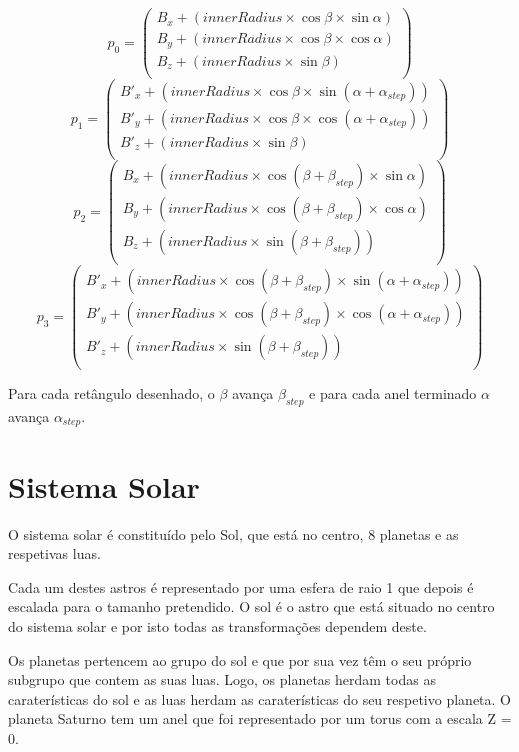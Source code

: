 \documentclass[a4paper]{article}
\newcommand{\x}{\times}
\begin{document}
\[p_0 =
\begin{pmatrix}
    B_x + (innerRadius \x \cos \beta \x \sin \alpha)\\
    B_y + (innerRadius \x \cos \beta \x \cos \alpha)\\
    B_z + (innerRadius \x \sin \beta)\\
\end{pmatrix}
\]
\[p_1 =
\begin{pmatrix}
    B'_x + (innerRadius \x \cos \beta \x \sin(\alpha + \alpha_{step}))\\
    B'_y + (innerRadius \x \cos \beta \x \cos(\alpha + \alpha_{step}))\\
    B'_z + (innerRadius \x \sin \beta)\\
\end{pmatrix}
\]
\[p_2 =
\begin{pmatrix}
    B_x + (innerRadius \x \cos(\beta + \beta_{step}) \x \sin \alpha)\\
    B_y + (innerRadius \x \cos(\beta + \beta_{step}) \x \cos \alpha)\\
    B_z + (innerRadius \x \sin(\beta + \beta_{step})) \\
\end{pmatrix}
\]
\[p_3 =
\begin{pmatrix}
    B'_x + (innerRadius \x \cos(\beta + \beta_{step}) \x \sin(\alpha + \alpha_{step}))\\
    B'_y + (innerRadius \x \cos(\beta + \beta_{step}) \x \cos(\alpha + \alpha_{step}))\\
    B'_z + (innerRadius \x \sin(\beta + \beta_{step}))\\
\end{pmatrix}
\]

Para cada retângulo desenhado, o $\beta$ avança $\beta_{step}$ e para cada anel terminado $\alpha$ avança $\alpha_{step}$.

\section{Sistema Solar}

O sistema solar é constituído pelo Sol, que está no centro, 8 planetas e as respetivas luas.

Cada um destes astros é representado por uma esfera de raio 1 que depois é escalada para o tamanho pretendido. O sol é o astro que está situado no centro do sistema solar e por isto todas as transformações dependem deste.

Os planetas pertencem ao grupo do sol e que por sua vez têm o seu próprio subgrupo que contem as suas luas. Logo, os planetas herdam todas as caraterísticas do sol e as luas herdam as caraterísticas do seu respetivo planeta.
O planeta Saturno tem um anel que foi representado por um torus com a escala Z = 0.
\end{document}
